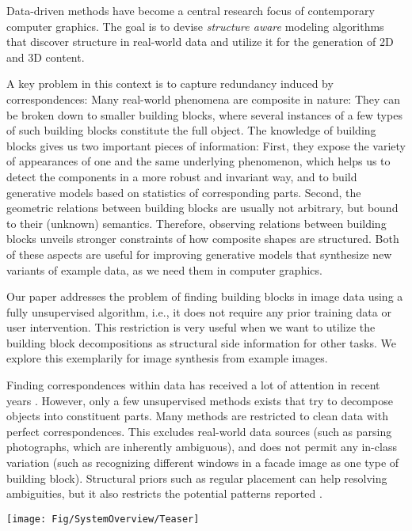 \documentclass{acmtog}
\begin{document}
Data-driven methods have become a central research focus of contemporary computer graphics. The goal is to devise \emph{structure aware} modeling algorithms that discover structure in real-world data and utilize it for the generation of 2D and 3D content.

A key problem in this context is to capture redundancy induced by correspondences: Many real-world phenomena are composite in nature: They can be broken down to smaller building blocks, where several instances of a few types of such building blocks constitute the full object. The knowledge of building blocks gives us two important pieces of information: First, they expose the variety of appearances of one and the same underlying phenomenon, which helps us to detect the components in a more robust and invariant way, and to build generative models based on statistics of corresponding parts. Second, the geometric relations between building blocks are usually not arbitrary, but bound to their (unknown) semantics. Therefore, observing relations between building blocks unveils stronger constraints of how composite shapes are structured. Both of these aspects are useful for improving generative models that synthesize new variants of example data, as we need them in computer graphics.

Our paper addresses the problem of finding  building blocks in image data using a fully unsupervised algorithm, i.e., it does not require any prior training data or user intervention. This restriction is very useful when we want to utilize the building block decompositions as structural side information for other tasks. We explore this exemplarily for image synthesis from example images.

Finding correspondences within data has received a lot of attention in recent years \cite{Mitra2012}. However, only a few unsupervised methods exists that try to decompose objects into constituent parts. Many methods are restricted to clean data with perfect correspondences. This excludes real-world data sources (such as parsing photographs, which are inherently ambiguous), and does not permit any in-class variation (such as recognizing different windows in a facade image as one type of building block). Structural priors such as regular placement can help resolving ambiguities, but it also restricts the potential patterns reported \cite{Wu2010DL}. 

\begin{figure*}[t!]
  \centering
  \texttt{[image: Fig/SystemOverview/Teaser]}
  \caption{...} 
	\label{fig:Teaser}
\end{figure*}
\end{document}

